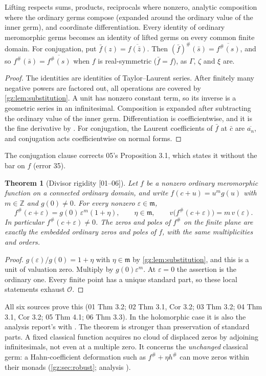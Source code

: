 \documentclass[11pt,a4paper]{article}
\numberwithin{equation}{section}
\newtheorem{theorem}{Theorem}[section]
\theoremstyle{definition}
\theoremstyle{remark}
\newcommand{\Z}{\mathbb Z}
\newcommand{\OO}{\mathcal O}
\newcommand{\mm}{\mathfrak m}
\newcommand{\eps}{\varepsilon}
\newcommand{\src}[1]{\textup{[#1]}}
\begin{document}
\begin{proposition}[Functoriality \src{01--06}]\label{gz:prop:functorial}
Lifting respects sums, products, reciprocals where nonzero, analytic
composition where the ordinary germs compose (expanded around the ordinary
value of the inner germ), and coordinate differentiation. Every identity of
ordinary meromorphic germs becomes an identity of lifted germs on every
common finite domain. For conjugation, put $\bar f(z)=\overline{f(\bar z)}$.
Then $(\bar f)^\#(\bar s)=\overline{f^\#(s)}$, and so
$f^\#(\bar s)=\overline{f^\#(s)}$ when $f$ is real-symmetric
($\bar f=f$), as $\Gamma$, $\zeta$ and $\xi$ are.
\end{proposition}
\begin{proof}
The identities are identities of Taylor--Laurent series. After finitely many
negative powers are factored out, all operations are covered by
\cref{gz:lem:substitution}. A unit has nonzero constant term, so its inverse
is a geometric series in an infinitesimal. Composition is expanded after
subtracting the ordinary value of the inner germ. Differentiation is
coefficientwise, and it is the fine derivative by . For
conjugation, the Laurent coefficients of $\bar f$ at $\bar c$ are
$\overline{a_n}$, and conjugation acts coefficientwise on normal forms.
\end{proof}
The conjugation clause corrects 05's Proposition 3.1, which states it
without the bar on $f$ (error 35).

\begin{theorem}[Divisor rigidity \src{01--06}]\label{gz:thm:divisor}
Let $f$ be a nonzero ordinary meromorphic function on a connected ordinary
domain, and write $f(c+u)=u^mg(u)$ with $m\in\Z$ and $g(0)\ne0$. For every
nonzero $\eps\in\mm$,
\[
f^\#(c+\eps)=g(0)\,\eps^m(1+\eta),\qquad\eta\in\mm,\qquad
v\bigl(f^\#(c+\eps)\bigr)=m\,v(\eps).
\]
In particular $f^\#(c+\eps)\ne0$. The zeros and poles of $f^\#$ on the
finite plane are exactly the embedded ordinary zeros and poles of $f$, with
the same multiplicities and orders.
\end{theorem}
\begin{proof}
$g(\eps)/g(0)=1+\eta$ with $\eta\in\mm$ by \cref{gz:lem:substitution}, and
this is a unit of valuation zero. Multiply by $g(0)\eps^m$. At $\eps=0$ the
assertion is the ordinary one. Every finite point has a unique standard
part, so these local statements exhaust $\OO$.
\end{proof}
All six sources prove this (01 Thm 3.2; 02 Thm 3.1, Cor 3.2; 03 Thm 3.2;
04 Thm 3.1, Cor 3.2; 05 Thm 4.1; 06 Thm 3.3). In the holomorphic case it
is also the analysis report's  with
. The theorem is
stronger than preservation of standard parts. A fixed classical function
acquires no cloud of displaced zeros by adjoining infinitesimals, not even
at a multiple zero. It concerns the \emph{unchanged} classical germ: a
Hahn-coefficient deformation such as $f^\#+\eta h^\#$ can move zeros within
their monads (\cref{gz:sec:robust}; analysis ).
\end{document}
